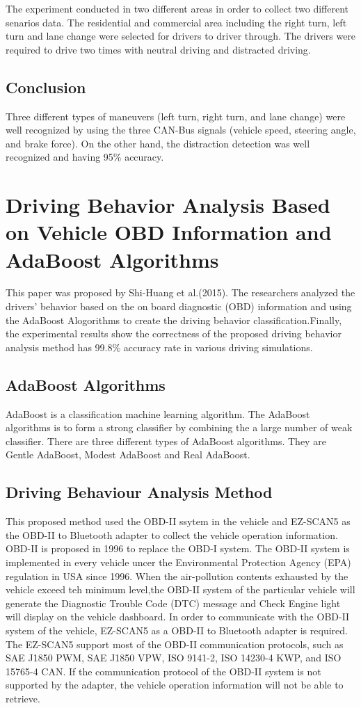 The experiment conducted in two different areas in order to collect two different senarios data. The residential and commercial area including the right turn, left turn and lane change were selected for drivers to driver through. The drivers were required to drive two times with neutral driving and distracted driving. 
 
\subsection{Conclusion}
Three different types of maneuvers (left turn, right turn, and lane change) were well recognized by using the three CAN-Bus signals (vehicle speed, steering angle, and brake force). On the other hand, the distraction detection was well recognized and having 95\% accuracy.


\section{Driving Behavior Analysis Based on Vehicle OBD Information and AdaBoost Algorithms}
This paper was proposed by Shi-Huang et al.(2015). The researchers analyzed the drivers' behavior based on the on board diagnostic (OBD) information and using the AdaBoost Alogorithms to create the driving  behavior classification.Finally, the experimental results show the correctness of the proposed driving behavior analysis method has 99.8\% accuracy rate in various driving simulations.

\subsection{AdaBoost Algorithms}
AdaBoost is a classification machine learning algorithm. The AdaBoost algorithms is to form a strong classifier by combining the a large number of weak classifier. There are three different types of AdaBoost algorithms. They are Gentle AdaBoost, Modest AdaBoost and Real AdaBoost.

\subsection{Driving Behaviour Analysis Method}
This proposed method used the OBD-II ssytem in the vehicle and EZ-SCAN5 as the OBD-II to Bluetooth adapter to collect the vehicle operation information. OBD-II is proposed in 1996 to replace the OBD-I system. The OBD-II system is implemented in every vehicle uncer the Environmental Protection Agency (EPA) regulation in USA since 1996. When the air-pollution contents exhausted by the vehicle exceed teh minimum level,the OBD-II system of the particular vehicle will generate the Diagnostic Trouble Code (DTC) message and Check Engine light will display on the vehicle dashboard. In order to communicate with the OBD-II system of the vehicle, EZ-SCAN5 as a OBD-II to Bluetooth adapter is required. The EZ-SCAN5 support most of the OBD-II communication protocols, such as SAE J1850 PWM, SAE J1850 VPW, ISO 9141-2, ISO 14230-4 KWP, and ISO 15765-4 CAN. If the communication protocol of the OBD-II system is not supported by the adapter, the vehicle operation information will not be able to retrieve.

